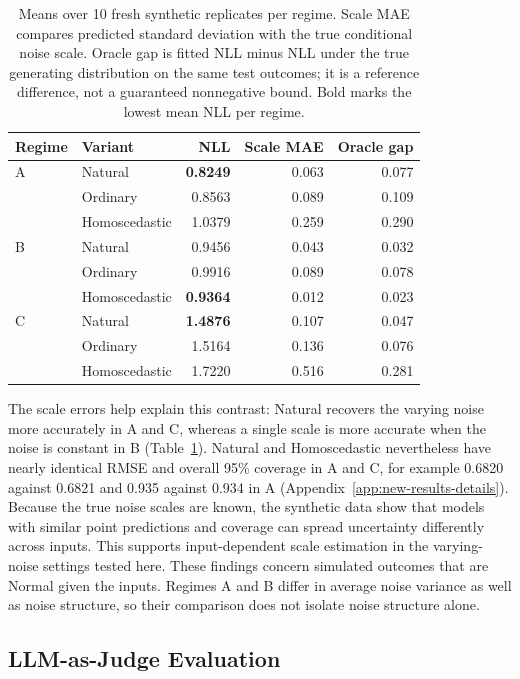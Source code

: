 \begin{table}[t]
\centering
\small
\setlength{\tabcolsep}{3.5pt}
\begin{tabular}{@{}llrrr@{}}
\toprule
Regime & Variant & NLL & Scale MAE & Oracle gap \\
\midrule
A & Natural & \textbf{0.8249} & 0.063 & 0.077 \\
& Ordinary & 0.8563 & 0.089 & 0.109 \\
& Homoscedastic & 1.0379 & 0.259 & 0.290 \\
\midrule
B & Natural & 0.9456 & 0.043 & 0.032 \\
& Ordinary & 0.9916 & 0.089 & 0.078 \\
& Homoscedastic & \textbf{0.9364} & 0.012 & 0.023 \\
\midrule
C & Natural & \textbf{1.4876} & 0.107 & 0.047 \\
& Ordinary & 1.5164 & 0.136 & 0.076 \\
& Homoscedastic & 1.7220 & 0.516 & 0.281 \\
\bottomrule
\end{tabular}
\caption{Means over 10 fresh synthetic replicates per regime.
Scale MAE compares predicted standard deviation with the true conditional noise scale.
Oracle gap is fitted NLL minus NLL under the true generating distribution on the same test outcomes; it is a reference difference, not a guaranteed nonnegative bound.
Bold marks the lowest mean NLL per regime.}
\label{tab:synthetic-results}
\end{table}

The scale errors help explain this contrast: Natural recovers the varying noise more accurately in A and C, whereas a single scale is more accurate when the noise is constant in B (Table~\ref{tab:synthetic-results}).
Natural and Homoscedastic nevertheless have nearly identical RMSE and overall 95\% coverage in A and C, for example 0.6820 against 0.6821 and 0.935 against 0.934 in A (Appendix~\ref{app:new-results-details}).
Because the true noise scales are known, the synthetic data show that models with similar point predictions and coverage can spread uncertainty differently across inputs.
This supports input-dependent scale estimation in the varying-noise settings tested here.
These findings concern simulated outcomes that are Normal given the inputs.
Regimes A and B differ in average noise variance as well as noise structure, so their comparison does not isolate noise structure alone.

\subsection{LLM-as-Judge Evaluation}

